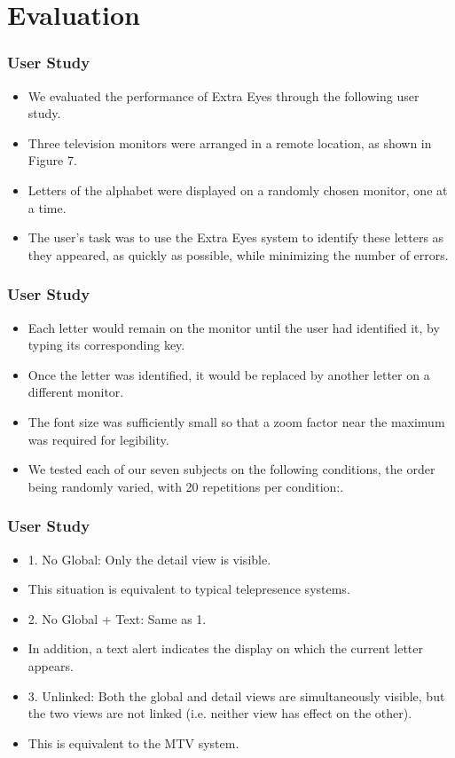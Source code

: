 \documentclass{beamer}
\begin{document}
\section[Evaluation]{Evaluation}


\begin{frame}
\frametitle{User Study}

\begin{itemize}
\item We evaluated the performance of Extra Eyes through the following user study.
\item Three television monitors were arranged in a remote location, as shown in Figure 7.
\item Letters of the alphabet were displayed on a randomly chosen monitor, one at a time.
\item The user's task was to use the Extra Eyes system to identify these letters as they appeared, as quickly as possible, while minimizing the number of errors.
\end{itemize}

\end{frame}

\begin{frame}
\frametitle{User Study}

\begin{itemize}
\item Each letter would remain on the monitor until the user had identified it, by typing its corresponding key.
\item Once the letter was identified, it would be replaced by another letter on a different monitor.
\item The font size was sufficiently small so that a zoom factor near the maximum was required for legibility.
\item We tested each of our seven subjects on the following conditions, the order being randomly varied, with 20 repetitions per condition:.
\end{itemize}

\end{frame}

\begin{frame}
\frametitle{User Study}

\begin{itemize}
\item 1. No Global: Only the detail view is visible.
\item This situation is equivalent to typical telepresence systems.
\item 2. No Global + Text: Same as 1.
\item In addition, a text alert indicates the display on which the current letter appears.
\item 3. Unlinked: Both the global and detail views are simultaneously visible, but the two views are not linked (i.e. neither view has effect on the other).
\item This is equivalent to the MTV system.
\end{itemize}

\end{frame}
\end{document}
